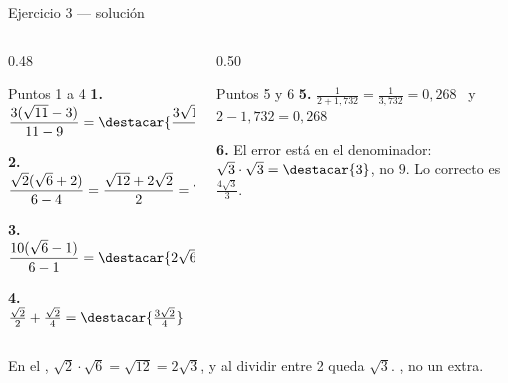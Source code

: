 \documentclass[aspectratio=169,10pt]{beamer}
\begin{document}
\begin{frame}{Ejercicio 3 — solución}
  \scriptsize
  \begin{columns}[T,onlytextwidth]
    \begin{column}{0.48\textwidth}
      \begin{block}{Puntos 1 a 4}
        \tiny
        \textbf{1.} $\dfrac{3(\sqrt{11}-3)}{11-9}
        = \destacar{\dfrac{3\sqrt{11}-9}{2}}$

        \vspace{0.06cm}
        \textbf{2.} $\dfrac{\sqrt2(\sqrt6+2)}{6-4}
        = \dfrac{\sqrt{12}+2\sqrt2}{2} = \destacar{\sqrt{3}+\sqrt{2}}$

        \vspace{0.06cm}
        \textbf{3.} $\dfrac{10(\sqrt6-1)}{6-1} = \destacar{2\sqrt{6}-2}$

        \vspace{0.06cm}
        \textbf{4.} $\tfrac{\sqrt2}{2} + \tfrac{\sqrt2}{4}
        = \destacar{\tfrac{3\sqrt{2}}{4}}$
      \end{block}
    \end{column}
    \begin{column}{0.50\textwidth}
      \begin{alertblock}{Puntos 5 y 6}
        \tiny
        \textbf{5.} $\tfrac{1}{2+1{,}732} = \tfrac{1}{3{,}732}
        = 0{,}268$ \ y \ $2-1{,}732 = 0{,}268$ \checkmark

        \vspace{0.08cm}
        \textbf{6.} El error está en el denominador:
        $\sqrt3\cdot\sqrt3 = \destacar{3}$, no $9$. Lo correcto es
        $\tfrac{4\sqrt3}{3}$.
      \end{alertblock}
    \end{column}
  \end{columns}

  \vspace{0.05cm}
  {\tiny\color{uniGris} En el , $\sqrt2\cdot\sqrt6 = \sqrt{12}
  = 2\sqrt3$, y al dividir entre 2 queda $\sqrt3$. , no un extra.}
\end{frame}
\end{document}
